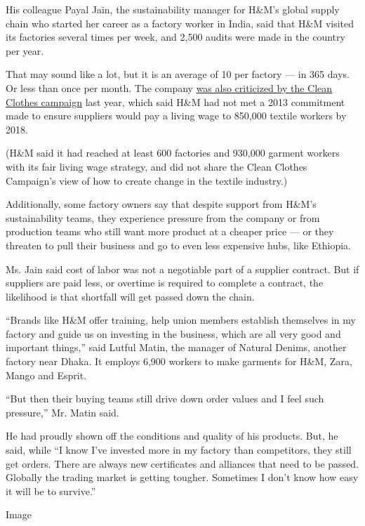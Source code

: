 His colleague Payal Jain, the sustainability manager for H\&M's global
supply chain who started her career as a factory worker in India, said
that H\&M visited its factories several times per week, and 2,500 audits
were made in the country per year.

That may sound like a lot, but it is an average of 10 per factory --- in
365 days. Or less than once per month. The company
\href{https://www.reuters.com/article/us-workers-garment-abuse/hm-accused-of-failing-to-ensure-fair-wages-for-global-factory-workers-idUSKCN1M41GR}{was
also criticized by the Clean Clothes campaign} last year, which said
H\&M had not met a 2013 commitment made to ensure suppliers would pay a
living wage to 850,000 textile workers by 2018.

(H\&M said it had reached at least 600 factories and 930,000 garment
workers with its fair living wage strategy, and did not share the Clean
Clothes Campaign's view of how to create change in the textile
industry.)

Additionally, some factory owners say that despite support from H\&M's
sustainability teams, they experience pressure from the company or from
production teams who still want more product at a cheaper price --- or
they threaten to pull their business and go to even less expensive hubs,
like Ethiopia.

Ms. Jain said cost of labor was not a negotiable part of a supplier
contract. But if suppliers are paid less, or overtime is required to
complete a contract, the likelihood is that shortfall will get passed
down the chain.

``Brands like H\&M offer training, help union members establish
themselves in my factory and guide us on investing in the business,
which are all very good and important things,'' said Lutful Matin, the
manager of Natural Denims, another factory near Dhaka. It employs 6,900
workers to make garments for H\&M, Zara, Mango and Esprit.

``But then their buying teams still drive down order values and I feel
such pressure,'' Mr. Matin said.

He had proudly shown off the conditions and quality of his products.
But, he said, while ``I know I've invested more in my factory than
competitors, they still get orders. There are always new certificates
and alliances that need to be passed. Globally the trading market is
getting tougher. Sometimes I don't know how easy it will be to
survive.''

Image

